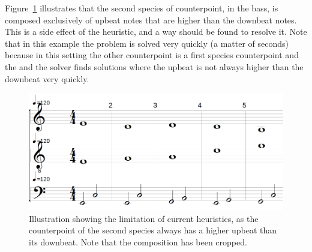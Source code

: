 \begin{itemize}
  Figure~\ref{fig:limitation-lowest-array} illustrates that the second species of counterpoint, in the bass, is composed exclusively of upbeat notes that are higher than the downbeat notes. This is a side effect of the heuristic, and a way should be found to resolve it. Note that in this example the problem is solved very quickly (a matter of seconds) because in this setting the other counterpoint is a first species counterpoint and the and the solver finds solutions where the upbeat is not always higher than the downbeat very quickly.
\end{itemize}
\begin{figure}[h]
  \centering
  \includegraphics[width=.6\textwidth]{Images/limitation-with-lowest-array.png}
  \caption{Illustration showing the limitation of current heuristics, as the counterpoint of the second species always has a higher upbeat than its downbeat. Note that the composition has been cropped.}
  \label{fig:limitation-lowest-array}
\end{figure}




